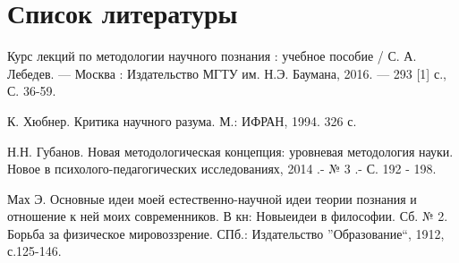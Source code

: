 \documentclass[14pt]{article}
\begin{document}
\section{Список литературы}

\begin{thebibliography}{99}

 Курс лекций по методологии научного познания : учебное пособие / С. А. Лебедев. — Москва : Издательство МГТУ им. Н.Э. Баумана, 2016. — 293 [1] с., С. 36-59.  
  
 К. Хюбнер. Критика научного разума. М.: ИФРАН, 1994. 326 с.  
  
 Н.Н. Губанов. Новая методологическая концепция: уровневая методология науки. Новое в психолого-педагогических исследованиях, 2014 .- № 3 .- С. 192 - 198.  
  
  Мах Э. Основные идеи моей естественно-научной идеи теории познания и отношение к ней моих современников. В кн: Новыеидеи в философии. Сб. № 2. Борьба за физическое мировоззрение. СПб.: Издательство ''Образование``, 1912, с.125-146. 
\end{thebibliography}
\end{document}
